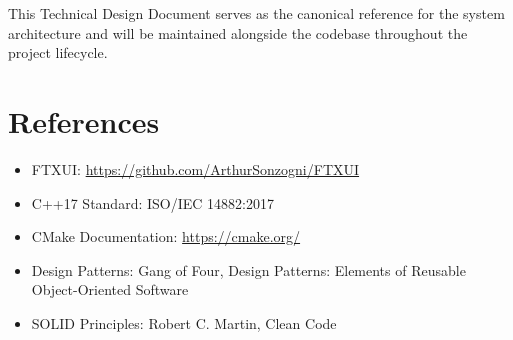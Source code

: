 \documentclass[12pt,a4paper,oneside,openany]{report}
\begin{document}
This Technical Design Document serves as the canonical reference for the system architecture and will be maintained alongside the codebase throughout the project lifecycle.

\chapter*{References}

\begin{itemize}
	\item FTXUI: \url{https://github.com/ArthurSonzogni/FTXUI}
	\item C++17 Standard: ISO/IEC 14882:2017
	\item CMake Documentation: \url{https://cmake.org/}
	\item Design Patterns: Gang of Four, Design Patterns: Elements of Reusable Object-Oriented Software
	\item SOLID Principles: Robert C. Martin, Clean Code
\end{itemize}
\end{document}

